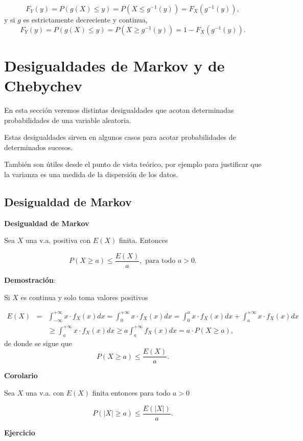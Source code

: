 \documentclass[
  letterpaper,
  DIV=11,
  numbers=noendperiod]{scrreprt}
\begin{document}
\[
F_{Y}(y)=P(g(X)\leq y)=P(X\leq g^{-1}(y))=F_{X}(g^{-1}(y)),
\] y si \(g\) es estrictamente decreciente y continua, \[
F_{Y}(y)=P(g(X)\leq y)=P(X\geq g^{-1}(y))=1-F_{X}(g^{-1}(y)).
\]

\hypertarget{desigualdades-de-markov-y-de-chebychev}{%
\section{Desigualdades de Markov y de
Chebychev}\label{desigualdades-de-markov-y-de-chebychev}}

En esta sección veremos distintas desigualdades que acotan determinadas
probabilidades de una variable aleatoria.

Estas desigualdades sirven en algunos casos para acotar probabilidades
de determinados sucesos.

También son útiles desde el punto de vista teórico, por ejemplo para
justificar que la varianza es una medida de la dispersión de los datos.

\hypertarget{desigualdad-de-markov}{%
\subsection{Desigualdad de Markov}\label{desigualdad-de-markov}}

\textbf{Desigualdad de Markov}

Sea \(X\) una v.a. positiva con \(E(X)\) finita. Entonces

\[P(X\geq a)\leq \frac{E(X)}{a},\mbox{ para todo }a>0.\]

\textbf{Demostración}:

Si \(X\) es continua y solo toma valores positivos

\begin{eqnarray*}
E(X) &=& \int_{-\infty}^{+\infty} x\cdot  f_{X}(x) dx=  \int_0^{+\infty} x\cdot f_{X}(x) dx=  \int_0^{a} x\cdot  f_{X}(x) dx +\int_{a}^{+\infty} x\cdot f_{X}(x) dx \\
& &\geq   \int_{a}^{+\infty} x\cdot
f_{X}(x) dx \geq a \int_{a}^{+\infty}
f_{X}(x) dx = a \cdot  P(X\geq a),
\end{eqnarray*} de donde se sigue que \[P(X\geq a)\leq \frac{E(X)}{a}.\]

\textbf{Corolario}

Sea \(X\) una v.a. con \(E(X)\) finita entonces para todo \(a>0\)

\[P(|X|\geq a )\leq \frac{E(|X|)}{a}.\]

\textbf{Ejercicio}
\end{document}

